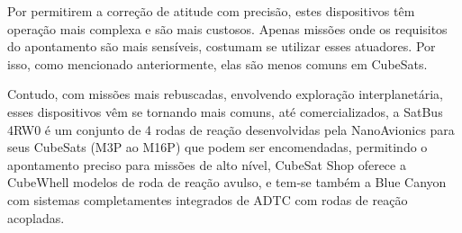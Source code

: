  Por permitirem a correção de atitude com precisão, estes dispositivos têm operação mais complexa e são mais custosos. Apenas missões onde os requisitos do apontamento são mais sensíveis, costumam se utilizar esses atuadores. Por isso, como mencionado anteriormente, elas são menos comuns em CubeSats.
 
 Contudo, com missões mais rebuscadas, envolvendo exploração interplanetária, esses dispositivos vêm se tornando mais comuns, até comercializados,  a SatBus 4RW0 é um conjunto de 4 rodas de reação desenvolvidas pela NanoAvionics para seus CubeSats (M3P ao M16P) que podem ser encomendadas, permitindo o apontamento preciso para missões de alto nível, CubeSat Shop oferece a CubeWhell modelos de roda de reação avulso, e tem-se também a Blue Canyon com sistemas completamentes integrados de ADTC com rodas de reação acopladas.
